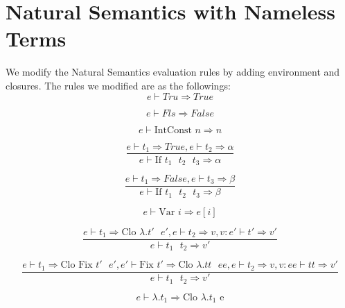 \documentclass[10pt]{article}
\begin{document}
\section{Natural Semantics with Nameless Terms}
We modify the Natural Semantics evaluation rules by adding environment and closures. The rules we modified are as the followings:\\

\begin{equation*}
e \vdash Tru \Rightarrow True
\end{equation*}

\begin{equation*}
e \vdash Fls \Rightarrow False
\end{equation*}

\begin{equation*}
e \vdash \text{IntConst $n$} \Rightarrow n
\end{equation*}

\begin{equation*}
\frac{e \vdash t_1 \Rightarrow True, e\vdash t_2 \Rightarrow \alpha}{e\vdash \text{If  $t_1$ $t_2$ $t_3$} \Rightarrow \alpha}
\end{equation*}

\begin{equation*}
\frac{e \vdash t_1 \Rightarrow False, e\vdash t_3 \Rightarrow \beta}{e\vdash \text{If  $t_1$ $t_2$ $t_3$} \Rightarrow \beta}
\end{equation*}

\begin{equation*}
e \vdash \text{Var $i$} \Rightarrow e[i]
\end{equation*}

\begin{equation*}
\frac{e \vdash t_1 \Rightarrow \text{Clo $\lambda.t'$ $e'$}, e \vdash t_2 \Rightarrow v, v:e' \vdash t' \Rightarrow v'}{e \vdash \text{$t_1$ $t_2$} \Rightarrow v'}
\end{equation*}

\begin{equation*}
\frac{e \vdash t_1 \Rightarrow \text{Clo Fix $t'$ $e'$}, e' \vdash \text{Fix $t'$}  \Rightarrow \text{Clo $\lambda.tt$ $ee$}, e \vdash t_2 \Rightarrow v, v:ee \vdash tt \Rightarrow v'}{e \vdash \text{$t_1$ $t_2$} \Rightarrow v'}
\end{equation*}

\begin{equation*}
e \vdash \lambda.t_1 \Rightarrow \text{Clo $\lambda.t_1$ e}
\end{equation*}
\end{document}
